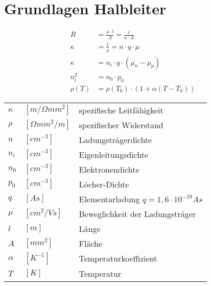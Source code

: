 \newpage
\section{Grundlagen Halbleiter}
	\begin{minipage}{8cm}
		\begin{align*}
			R &= \frac{\rho \cdot l}{A} = \frac{l}{\kappa \cdot A} \\
			\kappa &= \frac{1}{\rho}  = n \cdot q \cdot \mu \\
			\kappa &= n_i \cdot q \cdot \left( \mu_n - \mu_p \right) \\
			n_i^2 &= n_0 \cdot p_0 \\
			\rho(T) &= \rho(T_0) \cdot \left(1 + \alpha(T-T_0)\right)
		\end{align*}
	\end{minipage}
	\begin{minipage}{8cm}
		\begin{tabular}{lll}
		$\kappa$	& $[{m}/{\Omega mm^2}]$	& spezifische Leitfähigkeit \\
		$\rho$		& $[{\Omega mm^2}/{m}]$	& spezifischer Widerstand \\
		$n$			& $[cm^{-3}]$ & Ladungsträgerdichte \\
		$n_i$		& $[cm^{-3}]$ & Eigenleitungsdichte \\
		$n_0$		& $[cm^{-3}]$ & Elektronendichte \\
		$p_0$		& $[cm^{-3}]$ & Löcher-Dichte \\
		$q$			& $[As]$	& Elementarladung $q=1,6 \cdot 10^{-19} As$ \\ 
		$\mu$		& $[{cm^2}/{Vs}]$	& Beweglichkeit der Ladungsträger \\
		$l$			& $[m]$	& Länge \\
		$A$			& $[mm^2]$	& Fläche \\
		$\alpha$	& $[K^{-1}]$ & Temperaturkoeffizient \\
		$T$			& $[K]$	& Temperatur \\
		\end{tabular}
	\end{minipage}